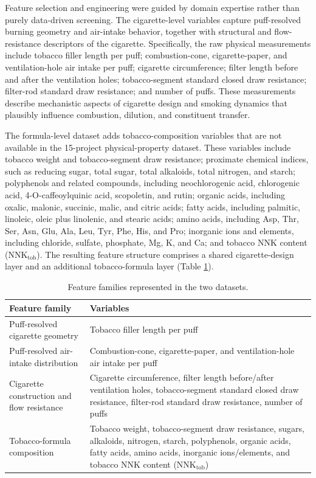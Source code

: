 \documentclass[11pt]{article}
\begin{document}
Feature selection and engineering were guided by domain expertise rather than purely data-driven screening. The cigarette-level variables capture puff-resolved burning geometry and air-intake behavior, together with structural and flow-resistance descriptors of the cigarette. Specifically, the raw physical measurements include tobacco filler length per puff; combustion-cone, cigarette-paper, and ventilation-hole air intake per puff; cigarette circumference; filter length before and after the ventilation holes; tobacco-segment standard closed draw resistance; filter-rod standard draw resistance; and number of puffs. These measurements describe mechanistic aspects of cigarette design and smoking dynamics that plausibly influence combustion, dilution, and constituent transfer.

The formula-level dataset adds tobacco-composition variables that are not available in the 15-project physical-property dataset. These variables include tobacco weight and tobacco-segment draw resistance; proximate chemical indices, such as reducing sugar, total sugar, total alkaloids, total nitrogen, and starch; polyphenols and related compounds, including neochlorogenic acid, chlorogenic acid, 4-O-caffeoylquinic acid, scopoletin, and rutin; organic acids, including oxalic, malonic, succinic, malic, and citric acids; fatty acids, including palmitic, linoleic, oleic plus linolenic, and stearic acids; amino acids, including Asp, Thr, Ser, Asn, Glu, Ala, Leu, Tyr, Phe, His, and Pro; inorganic ions and elements, including chloride, sulfate, phosphate, Mg, K, and Ca; and tobacco NNK content ($\mathrm{NNK}_{\mathrm{tob}}$). The resulting feature structure comprises a shared cigarette-design layer and an additional tobacco-formula layer (Table \ref{tab:feature_dimensions}).

\begin{table}[H]
    \centering
    \caption{Feature families represented in the two datasets.}
    \label{tab:feature_dimensions}
    \begin{tabular}{p{} p{}}
        \toprule
        Feature family & Variables \\
        \midrule
        Puff-resolved cigarette geometry & Tobacco filler length per puff \\
        Puff-resolved air-intake distribution & Combustion-cone, cigarette-paper, and ventilation-hole air intake per puff \\
        Cigarette construction and flow resistance & Cigarette circumference, filter length before/after ventilation holes, tobacco-segment standard closed draw resistance, filter-rod standard draw resistance, number of puffs \\
        Tobacco-formula composition & Tobacco weight, tobacco-segment draw resistance, sugars, alkaloids, nitrogen, starch, polyphenols, organic acids, fatty acids, amino acids, inorganic ions/elements, and tobacco NNK content ($\mathrm{NNK}_{\mathrm{tob}}$) \\
        \bottomrule
    \end{tabular}
\end{table}
\end{document}
